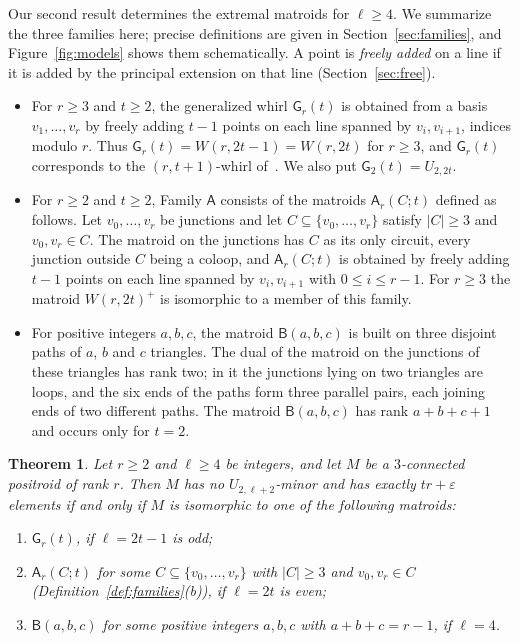 \documentclass[11pt]{amsart}
\newtheorem{theorem}{Theorem}[section]
\theoremstyle{definition}
\theoremstyle{remark}
\numberwithin{equation}{section}
\newcommand{\GW}{\mathsf{G}}
\newcommand{\FA}{\mathsf{A}}
\newcommand{\FB}{\mathsf{B}}
\begin{document}
Our second result determines the extremal matroids for $\ell\ge4$. We summarize the three families here; precise definitions are given in Section~\ref{sec:families}, and Figure~\ref{fig:models} shows them schematically. A point is \emph{freely added} on a line if it is added by the principal extension on that line (Section~\ref{sec:free}).
\begin{itemize}[leftmargin=2em]
\item For $r\ge3$ and $t\ge2$, the generalized whirl $\GW_r(t)$ is obtained from a basis $v_1,\dots,v_r$ by freely adding $t-1$ points on each line spanned by $v_i,v_{i+1}$, indices modulo $r$. Thus $\GW_r(t)=W(r,2t-1)=W(r,2t)$ for $r\ge3$, and $\GW_r(t)$ corresponds to the $(r,t+1)$-whirl of~\cite{dM03}. We also put $\GW_2(t)=U_{2,2t}$.
\item For $r\ge2$ and $t\ge2$, Family $\FA$ consists of the matroids $\FA_r(C;t)$ defined as follows. Let $v_0,\dots,v_r$ be junctions and let $C\subseteq\{v_0,\dots,v_r\}$ satisfy $|C|\ge3$ and $v_0,v_r\in C$. The matroid on the junctions has $C$ as its only circuit, every junction outside $C$ being a coloop, and $\FA_r(C;t)$ is obtained by freely adding $t-1$ points on each line spanned by $v_i,v_{i+1}$ with $0\le i\le r-1$. For $r\ge3$ the matroid $W(r,2t)^+$ is isomorphic to a member of this family.
\item For positive integers $a,b,c$, the matroid $\FB(a,b,c)$ is built on three disjoint paths of $a$, $b$ and $c$ triangles. The dual of the matroid on the junctions of these triangles has rank two; in it the junctions lying on two triangles are loops, and the six ends of the paths form three parallel pairs, each joining ends of two different paths. The matroid $\FB(a,b,c)$ has rank $a+b+c+1$ and occurs only for $t=2$.
\end{itemize}

\begin{theorem}\label{thm:classification}
Let $r\ge 2$ and $\ell\ge 4$ be integers, and let $M$ be a $3$-connected positroid of rank $r$. Then $M$ has no $U_{2,\ell+2}$-minor and has exactly $tr+\varepsilon$ elements if and only if $M$ is isomorphic to one of the following matroids:
\begin{enumerate}[label=\textup{(\roman*)}]
\item $\GW_r(t)$, if $\ell=2t-1$ is odd;
\item $\FA_r(C;t)$ for some $C\subseteq\{v_0,\dots,v_r\}$ with $|C|\ge3$ and $v_0,v_r\in C$ \textup{(}Definition~\textup{\ref{def:families}(b))}, if $\ell=2t$ is even;
\item $\FB(a,b,c)$ for some positive integers $a,b,c$ with $a+b+c=r-1$, if $\ell=4$.
\end{enumerate}
\end{theorem}
\end{document}
